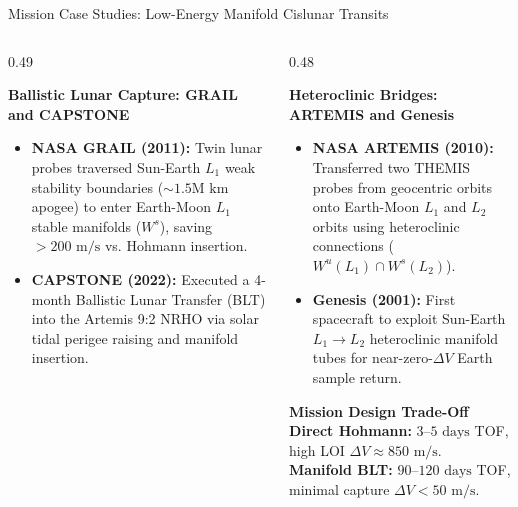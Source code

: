 \documentclass[aspectratio=169, 10pt]{beamer}
\begin{document}
\begin{frame}{Mission Case Studies: Low-Energy Manifold Cislunar Transits}
    \begin{columns}[t]
        \begin{column}{0.49\textwidth}
            \begin{block}{\textbf{Ballistic Lunar Capture: GRAIL and CAPSTONE}}
                \scriptsize
                \begin{itemize}\setlength{\itemsep}{2pt}
                    \item \textbf{NASA GRAIL (2011):} Twin lunar probes traversed Sun-Earth $L_1$ weak stability boundaries ($\sim 1.5\text{M km}$ apogee) to enter Earth-Moon $L_1$ stable manifolds ($W^s$), saving $>200\text{ m/s}$ vs. Hohmann insertion.
                    \item \textbf{CAPSTONE (2022):} Executed a 4-month Ballistic Lunar Transfer (BLT) into the Artemis 9:2 NRHO via solar tidal perigee raising and manifold insertion.
                \end{itemize}
            \end{block}
        \end{column}
        
        \begin{column}{0.48\textwidth}
            \begin{block}{\textbf{Heteroclinic Bridges: ARTEMIS and Genesis}}
                \scriptsize
                \begin{itemize}\setlength{\itemsep}{2pt}
                    \item \textbf{NASA ARTEMIS (2010):} Transferred two THEMIS probes from geocentric orbits onto Earth-Moon $L_1$ and $L_2$ orbits using heteroclinic connections ($W^u(L_1) \cap W^s(L_2)$).
                    \item \textbf{Genesis (2001):} First spacecraft to exploit Sun-Earth $L_1 \to L_2$ heteroclinic manifold tubes for near-zero-$\Delta V$ Earth sample return.
                \end{itemize}
            \end{block}
            \vspace{-0.1cm}
            \begin{alertblock}{\textbf{Mission Design Trade-Off}}
                \scriptsize
                \textbf{Direct Hohmann:} $3\text{--}5\text{ days}$ TOF, high LOI $\Delta V \approx 850\text{ m/s}$. \\
                \textbf{Manifold BLT:} $90\text{--}120\text{ days}$ TOF, minimal capture $\Delta V < 50\text{ m/s}$.
            \end{alertblock}
        \end{column}
    \end{columns}
\end{frame}
\end{document}

